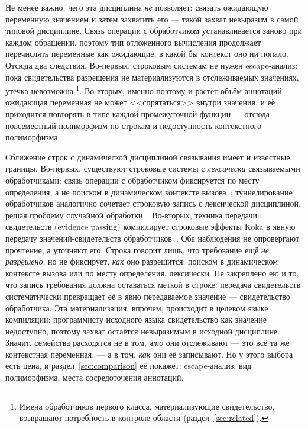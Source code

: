 \documentclass{ProcISPRAS}
\begin{document}
Не менее важно, чего эта дисциплина \emph{не} позволяет: связать ожидающую переменную
значением и затем захватить его --- такой захват невыразим в самой типовой дисциплине.
Связь операции с обработчиком
устанавливается заново при каждом обращении, поэтому тип отложенного вычисления продолжает
перечислять переменные как ожидающие, в какой бы контекст оно ни попало. Отсюда два
следствия. Во-первых, строковым системам не нужен escape-анализ: пока свидетельства
разрешения не материализуются в отслеживаемых значениях, утечка невозможна%
\footnote{Имена обработчиков первого класса, материализующие
свидетельство, возвращают потребность в контроле области (раздел~\ref{sec:related}).}.
Во-вторых, именно поэтому и растёт объём аннотаций: ожидающая
переменная не может <<спрятаться>> внутри значения, и её приходится повторять в типе
каждой промежуточной функции --- отсюда повсеместный полиморфизм по строкам и
недоступность контекстного полиморфизма.

Сближение строк с динамической дисциплиной связывания имеет и известные границы. Во-первых, существуют
строковые системы с \emph{лексически} связываемыми обработчиками: связь операции с
обработчиком фиксируется по месту определения, а не поиском в динамическом контексте
вызова~\cite{biernacki2019binders}; туннелирование обработчиков аналогично сочетает строковую
запись с лексической дисциплиной, решая проблему случайной
обработки~\cite{zhang2016accepting, zhang2020handling}. Во-вторых, техника передачи
свидетельств (evidence passing) компилирует строковые эффекты Koka в явную передачу
значений-свидетельств обработчиков~\cite{xie2021generalized}. Оба наблюдения не опровергают
прочтение, а уточняют его. Строка говорит лишь, что
требование ещё \emph{не разрешено}, но не фиксирует, \emph{как} оно разрешится:
поиском в динамическом контексте вызова или по месту определения, лексически. Не
закреплено ею и то, что запись требования должна оставаться меткой в строке: передача
свидетельств систематически превращает её в явно передаваемое значение --- свидетельство
обработчика. Эта материализация, впрочем, происходит в целевом языке компиляции:
программисту исходного языка свидетельство как значение недоступно, поэтому захват
остаётся невыразимым в исходной дисциплине. Значит, семейства расходятся не в том, \emph{что} они отслеживают --- это
всё та же контекстная переменная, --- а в том, \emph{как} они её записывают. Но у этого
выбора есть цена, и раздел~\ref{sec:comparison} её покажет: escape-анализ, вид
полиморфизма, места сосредоточения аннотаций.
\end{document}
